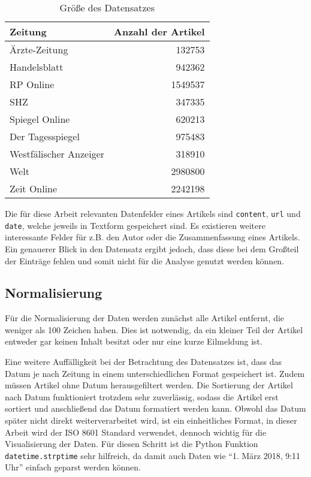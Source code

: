 \begin{table}[h]
\centering
\begin{spacing}{1.25}
\begin{tabular}[t]{lr}
\toprule
Zeitung & Anzahl der Artikel \\
\midrule
Ärzte-Zeitung & 132753 \\
Handelsblatt & 942362 \\
RP Online & 1549537 \\
SHZ & 347335 \\
Spiegel Online & 620213 \\
Der Tagesspiegel & 975483 \\
Westfälischer Anzeiger & 318910 \\
Welt & 2980800 \\
Zeit Online & 2242198 \\
\bottomrule
\end{tabular}
\caption{Größe des Datensatzes}
\label{data}
\end{spacing}
\end{table}

Die für diese Arbeit relevanten Datenfelder eines Artikels sind \texttt{content}, \texttt{url} und \texttt{date}, welche jeweils in Textform gespeichert sind. Es existieren weitere interessante Felder für z.B. den Autor oder die Zusammenfassung eines Artikels. Ein genauerer Blick in den Datensatz ergibt jedoch, dass diese bei dem Großteil der Einträge fehlen und somit nicht für die Analyse genutzt werden können.

\subsection{Normalisierung}
Für die Normalisierung der Daten werden zunächst alle Artikel entfernt, die weniger als 100 Zeichen haben. Dies ist notwendig, da ein kleiner Teil der Artikel entweder gar keinen Inhalt besitzt oder nur eine kurze Eilmeldung ist.

Eine weitere Auffälligkeit bei der Betrachtung des Datensatzes ist, dass das Datum je nach Zeitung in einem unterschiedlichen Format gespeichert ist. Zudem müssen Artikel ohne Datum herausgefiltert werden. Die Sortierung der Artikel nach Datum funktioniert trotzdem sehr zuverlässig, sodass die Artikel erst sortiert und anschließend das Datum formatiert werden kann. Obwohl das Datum später nicht direkt weiterverarbeitet wird, ist ein einheitliches Format, in dieser Arbeit wird der ISO 8601 Standard verwendet, dennoch wichtig für die Visualisierung der Daten. Für diesen Schritt ist die Python Funktion \texttt{datetime.strptime} sehr hilfreich, da damit auch Daten wie "`1. März 2018, 9:11 Uhr"' einfach geparst werden können.

